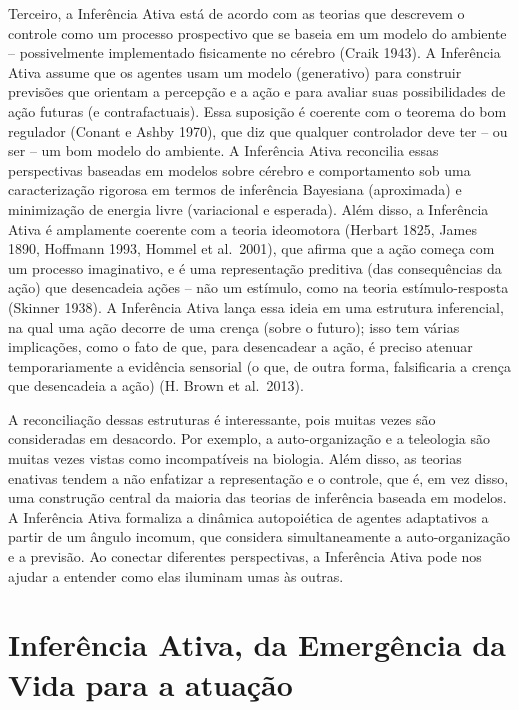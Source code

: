 \documentclass[
  12pt,
]{book}
\begin{document}
Terceiro, a Inferência Ativa está de acordo com as teorias que descrevem o controle como um processo prospectivo que se baseia em um modelo do ambiente -- possivelmente implementado fisicamente no cérebro (Craik 1943). A Inferência Ativa assume que os agentes usam um modelo (generativo) para construir previsões que orientam a percepção e a ação e para avaliar suas possibilidades de ação futuras (e contrafactuais). Essa suposição é coerente com o teorema do bom regulador (Conant e Ashby 1970), que diz que qualquer controlador deve ter -- ou ser -- um bom modelo do ambiente. A Inferência Ativa reconcilia essas perspectivas baseadas em modelos sobre cérebro e comportamento sob uma caracterização rigorosa em termos de inferência Bayesiana (aproximada) e minimização de energia livre (variacional e esperada). Além disso, a Inferência Ativa é amplamente coerente com a teoria ideomotora (Herbart 1825, James 1890, Hoffmann 1993, Hommel et al.~2001), que afirma que a ação começa com um processo imaginativo, e é uma representação preditiva (das consequências da ação) que desencadeia ações -- não um estímulo, como na teoria estímulo-resposta (Skinner 1938). A Inferência Ativa lança essa ideia em uma estrutura inferencial, na qual uma ação decorre de uma crença (sobre o futuro); isso tem várias implicações, como o fato de que, para desencadear a ação, é preciso atenuar temporariamente a evidência sensorial (o que, de outra forma, falsificaria a crença que desencadeia a ação) (H. Brown et al.~2013).

A reconciliação dessas estruturas é interessante, pois muitas vezes são consideradas em desacordo. Por exemplo, a auto-organização e a teleologia são muitas vezes vistas como incompatíveis na biologia. Além disso, as teorias enativas tendem a não enfatizar a representação e o controle, que é, em vez disso, uma construção central da maioria das teorias de inferência baseada em modelos. A Inferência Ativa formaliza a dinâmica autopoiética de agentes adaptativos a partir de um ângulo incomum, que considera simultaneamente a auto-organização e a previsão. Ao conectar diferentes perspectivas, a Inferência Ativa pode nos ajudar a entender como elas iluminam umas às outras.

\hypertarget{inferuxeancia-ativa-da-emerguxeancia-da-vida-para-a-atuauxe7uxe3o}{%
\section{Inferência Ativa, da Emergência da Vida para a atuação}\label{inferuxeancia-ativa-da-emerguxeancia-da-vida-para-a-atuauxe7uxe3o}}
\end{document}
